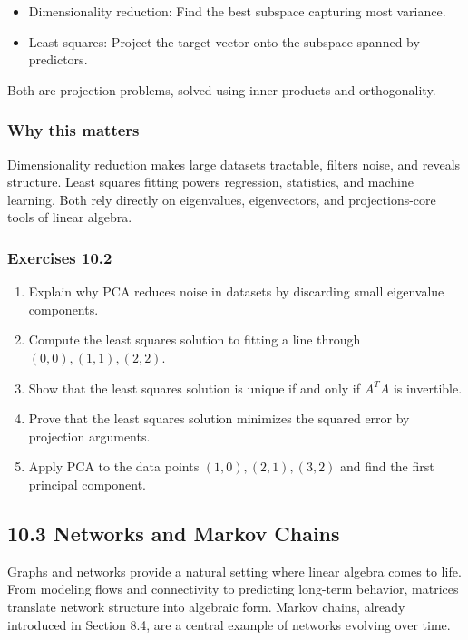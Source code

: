 \documentclass[
  12pt,
  a4paper,
]{article}
\begin{document}
\begin{itemize}
\item
  Dimensionality reduction: Find the best subspace capturing most
  variance.
\item
  Least squares: Project the target vector onto the subspace spanned by
  predictors.
\end{itemize}

Both are projection problems, solved using inner products and
orthogonality.

\subsubsection{Why this matters}\label{why-this-matters-37}

Dimensionality reduction makes large datasets tractable, filters noise,
and reveals structure. Least squares fitting powers regression,
statistics, and machine learning. Both rely directly on eigenvalues,
eigenvectors, and projections-core tools of linear algebra.

\subsubsection{Exercises 10.2}\label{exercises-102}

\begin{enumerate}
\def\labelenumi{\arabic{enumi}.}
\item
  Explain why PCA reduces noise in datasets by discarding small
  eigenvalue components.
\item
  Compute the least squares solution to fitting a line through
  \((0,0), (1,1), (2,2)\).
\item
  Show that the least squares solution is unique if and only if
  \(A^T A\) is invertible.
\item
  Prove that the least squares solution minimizes the squared error by
  projection arguments.
\item
  Apply PCA to the data points \((1,0), (2,1), (3,2)\) and find the
  first principal component.
\end{enumerate}

\subsection{10.3 Networks and Markov
Chains}\label{103-networks-and-markov-chains}

Graphs and networks provide a natural setting where linear algebra comes
to life. From modeling flows and connectivity to predicting long-term
behavior, matrices translate network structure into algebraic form.
Markov chains, already introduced in Section 8.4, are a central example
of networks evolving over time.
\end{document}
